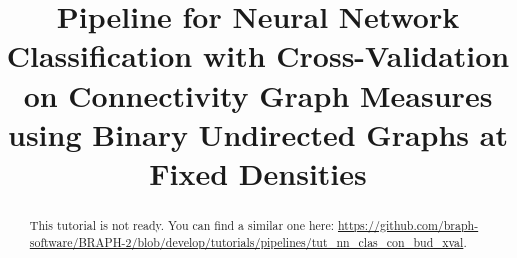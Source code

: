\documentclass[justified]{tufte-handout}
\title[Classification Cross-Validation Connectivity BUD Measure]{Pipeline for Neural Network Classification with Cross-Validation on Connectivity Graph Measures using Binary Undirected Graphs at Fixed Densities}
\begin{document}
\maketitle

\begin{abstract}
\noindent
This tutorial is not ready. You can find a similar one here: \url{https://github.com/braph-software/BRAPH-2/blob/develop/tutorials/pipelines/tut_nn_clas_con_bud_xval}.
\end{abstract}
\end{document}
